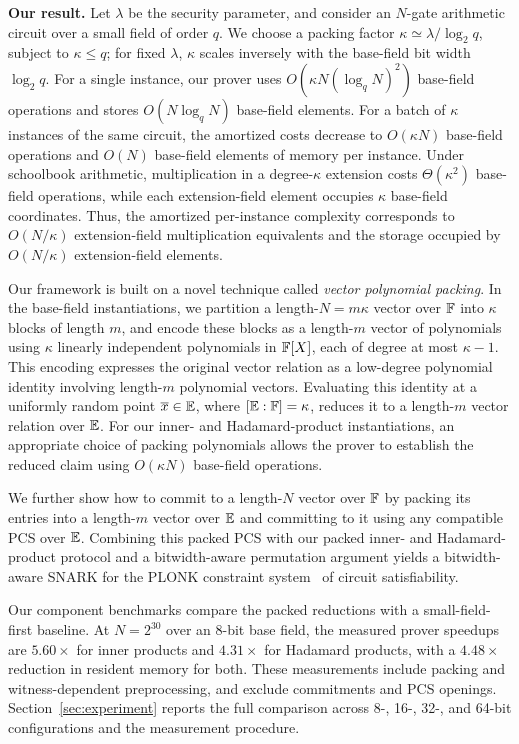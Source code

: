 \smallskip\noindent\textbf{Our result.}
Let $\lambda$ be the security parameter, and consider an $N$-gate
arithmetic circuit over a small field of order $q$.
We choose a packing factor $\kappa\simeq\lambda/\log_2 q$,
subject to $\kappa\le q$; for fixed $\lambda$, $\kappa$ scales
inversely with the base-field bit width $\log_2 q$.
For a single instance, our prover uses
$O(\kappa N(\log_q N)^2)$ base-field operations and stores
$O(N\log_q N)$ base-field elements.
For a batch of $\kappa$ instances of the same circuit, the
amortized costs decrease to $O(\kappa N)$ base-field operations
and $O(N)$ base-field elements of memory per instance.
Under schoolbook arithmetic, multiplication in a degree-$\kappa$
extension costs $\Theta(\kappa^2)$ base-field operations, while
each extension-field element occupies $\kappa$ base-field
coordinates.
Thus, the amortized per-instance complexity corresponds to
$O(N/\kappa)$ extension-field multiplication equivalents and
the storage occupied by $O(N/\kappa)$ extension-field elements.

\smallskip{}
Our \methodname framework is built on a novel technique called \emph{vector polynomial
packing}.
In the base-field instantiations, we partition a length-\(N=m\kappa\) vector over \({\mathbb{F}}\)
into \(\kappa\) blocks of length \(m\), and encode these blocks
as a length-\(m\) vector of polynomials using \(\kappa\)
linearly independent polynomials in \({\mathbb{F}}[X]\), each of
degree at most \(\kappa-1\).
This encoding expresses the original vector relation as a
low-degree polynomial identity involving length-\(m\) polynomial vectors.
Evaluating this identity at a uniformly random point
\(\overline{x}\in\mathbb{E}\), where
\([\mathbb{E}:{\mathbb{F}}]=\kappa\), reduces it to a
length-\(m\) vector relation over \(\mathbb{E}\).
For our inner- and Hadamard-product instantiations, an appropriate
choice of packing polynomials allows the prover to establish
the reduced claim using \(O(\kappa N)\) base-field operations.

We further show how to commit to a length-\(N\) vector over
\({\mathbb{F}}\) by packing its entries into a length-\(m\) vector
over \(\mathbb{E}\) and committing to it using any
compatible PCS over \(\mathbb{E}\).
Combining this packed PCS with our packed inner- and Hadamard-product protocol and
a bitwidth-aware permutation argument yields a bitwidth-aware
SNARK for the PLONK constraint system~\cite{iacr/GabizonWC19} of circuit satisfiability.


\smallskip{}
Our component benchmarks compare the packed reductions with a
small-field-first baseline. At \(N=2^{30}\) over an 8-bit base
field, the measured prover speedups are \(5.60\times\) for inner
products and \(4.31\times\) for Hadamard products, with a
\(4.48\times\) reduction in resident memory for both.
These measurements include packing and witness-dependent
preprocessing, and exclude commitments and PCS openings.
Section~\ref{sec:experiment} reports the full comparison across
8-, 16-, 32-, and 64-bit configurations and the measurement procedure.


